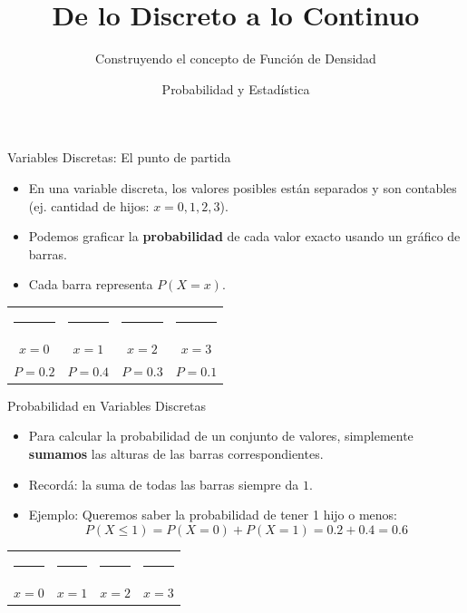 \documentclass[11pt, aspectratio=169]{beamer}
\title{De lo Discreto a lo Continuo}
\subtitle{Construyendo el concepto de Función de Densidad}
\author{Probabilidad y Estadística}
\date{}
\begin{document}
\begin{frame}
    \titlepage
\end{frame}

\begin{frame}{Variables Discretas: El punto de partida}
    \begin{itemize}
        \item En una variable discreta, los valores posibles están separados y son contables (ej. cantidad de hijos: $x=0, 1, 2, 3$).
        \item Podemos graficar la \textbf{probabilidad} de cada valor exacto usando un gráfico de barras.
        \item Cada barra representa $P(X=x)$.
    \end{itemize}
    \vspace{0.5cm}
    
    \begin{center}
        \begin{tabular}{cccc}
            \textcolor{blue}{\rule{0.8cm}{1.0cm}} & \textcolor{blue}{\rule{0.8cm}{2.0cm}} & \textcolor{blue}{\rule{0.8cm}{1.5cm}} & \textcolor{blue}{\rule{0.8cm}{0.5cm}} \\
            $x=0$ & $x=1$ & $x=2$ & $x=3$ \\
            $P=0.2$ & $P=0.4$ & $P=0.3$ & $P=0.1$
        \end{tabular}
    \end{center}
\end{frame}

\begin{frame}{Probabilidad en Variables Discretas}
    \begin{itemize}
        \item Para calcular la probabilidad de un conjunto de valores, simplemente \textbf{sumamos} las alturas de las barras correspondientes.
        \item Recordá: la suma de todas las barras siempre da $1$.
        \item Ejemplo: Queremos saber la probabilidad de tener 1 hijo o menos: 
        \begin{equation*}
            P(X \le 1) = P(X=0) + P(X=1) = 0.2 + 0.4 = \mathbf{0.6}
        \end{equation*}
    \end{itemize}
    \vspace{0.3cm}
    \begin{center}
        \begin{tabular}{cccc}
            \textcolor{orange}{\rule{0.8cm}{1.0cm}} & \textcolor{orange}{\rule{0.8cm}{2.0cm}} & \textcolor{lightgray}{\rule{0.8cm}{1.5cm}} & \textcolor{lightgray}{\rule{0.8cm}{0.5cm}} \\
            $x=0$ & $x=1$ & $x=2$ & $x=3$
        \end{tabular}
    \end{center}
\end{frame}
\end{document}
